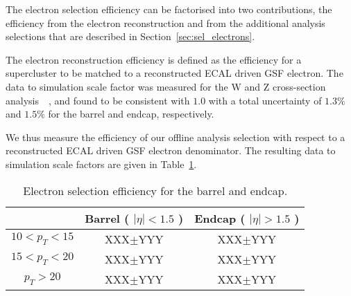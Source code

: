 
The electron selection efficiency can be factorised into two contributions,
the efficiency from the electron reconstruction and from the additional
analysis selections that are described in Section~\ref{sec:sel_electrons}.

The electron reconstruction efficiency is defined as the efficiency for a
supercluster to be matched to a reconstructed ECAL driven GSF electron.
The data to simulation scale factor was measured for the W and Z cross-section
analysis~\cite{VBTFCrossSectionNote}~\cite{ref:tagprobe_mit_w},
and found to be consistent with $1.0$ with a total uncertainty of
$1.3\%$ and $1.5\%$ for the barrel and endcap, respectively.

We thus measure the efficiency of our offline analysis selection 
with respect to a reconstructed ECAL driven GSF electron denominator. 
The resulting data to simulation scale factors are given in Table~\ref{tab:eff_ele_offline}.

\begin{table}[!ht]
\begin{center}
\begin{tabular}{c|c|c} 
\hline
              & Barrel ( $|\eta|<1.5$ )  & Endcap ( $|\eta|>1.5$ )  \\ 
\hline
$10<p_{T}<15$ & XXX$\pm$YYY & XXX$\pm$YYY                 \\ \hline
$15<p_{T}<20$ & XXX$\pm$YYY & XXX$\pm$YYY            \\ \hline
$p_T>20$   & XXX$\pm$YYY & XXX$\pm$YYY \\ \hline
\end{tabular}
\caption{Electron selection efficiency for the barrel and endcap.
\label{tab:eff_ele_offline}}
\end{center}
\end{table}
